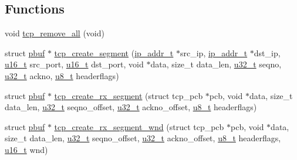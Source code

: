 \subsection*{Functions}
\begin{DoxyCompactItemize}
\item 
void \hyperlink{openmote-cc2538_2lwip_2test_2unit_2tcp_2tcp__helper_8c_ab5eb6956494f1deb9a97569d4b95ef6a}{tcp\+\_\+remove\+\_\+all} (void)
\item 
struct \hyperlink{structpbuf}{pbuf} $\ast$ \hyperlink{openmote-cc2538_2lwip_2test_2unit_2tcp_2tcp__helper_8c_aa6f4b7b087e8641f6c178d8752cc4fab}{tcp\+\_\+create\+\_\+segment} (\hyperlink{native_2lwip_2src_2include_2lwip_2ip__addr_8h_a88b43639738c4de2d3cd22e3a1fd7696}{ip\+\_\+addr\+\_\+t} $\ast$src\+\_\+ip, \hyperlink{native_2lwip_2src_2include_2lwip_2ip__addr_8h_a88b43639738c4de2d3cd22e3a1fd7696}{ip\+\_\+addr\+\_\+t} $\ast$dst\+\_\+ip, \hyperlink{group__compiler__abstraction_ga77570ac4fcab86864fa1916e55676da2}{u16\+\_\+t} src\+\_\+port, \hyperlink{group__compiler__abstraction_ga77570ac4fcab86864fa1916e55676da2}{u16\+\_\+t} dst\+\_\+port, void $\ast$data, size\+\_\+t data\+\_\+len, \hyperlink{group__compiler__abstraction_ga4c14294869aceba3ef9d4c0c302d0f33}{u32\+\_\+t} seqno, \hyperlink{group__compiler__abstraction_ga4c14294869aceba3ef9d4c0c302d0f33}{u32\+\_\+t} ackno, \hyperlink{group__compiler__abstraction_ga4caecabca98b43919dd11be1c0d4cd8e}{u8\+\_\+t} headerflags)
\item 
struct \hyperlink{structpbuf}{pbuf} $\ast$ \hyperlink{openmote-cc2538_2lwip_2test_2unit_2tcp_2tcp__helper_8c_a53b3207c8e960cdad9af044b0606a55b}{tcp\+\_\+create\+\_\+rx\+\_\+segment} (struct tcp\+\_\+pcb $\ast$pcb, void $\ast$data, size\+\_\+t data\+\_\+len, \hyperlink{group__compiler__abstraction_ga4c14294869aceba3ef9d4c0c302d0f33}{u32\+\_\+t} seqno\+\_\+offset, \hyperlink{group__compiler__abstraction_ga4c14294869aceba3ef9d4c0c302d0f33}{u32\+\_\+t} ackno\+\_\+offset, \hyperlink{group__compiler__abstraction_ga4caecabca98b43919dd11be1c0d4cd8e}{u8\+\_\+t} headerflags)
\item 
struct \hyperlink{structpbuf}{pbuf} $\ast$ \hyperlink{openmote-cc2538_2lwip_2test_2unit_2tcp_2tcp__helper_8c_aa45bbb22d0e973f9af6732ac35faed68}{tcp\+\_\+create\+\_\+rx\+\_\+segment\+\_\+wnd} (struct tcp\+\_\+pcb $\ast$pcb, void $\ast$data, size\+\_\+t data\+\_\+len, \hyperlink{group__compiler__abstraction_ga4c14294869aceba3ef9d4c0c302d0f33}{u32\+\_\+t} seqno\+\_\+offset, \hyperlink{group__compiler__abstraction_ga4c14294869aceba3ef9d4c0c302d0f33}{u32\+\_\+t} ackno\+\_\+offset, \hyperlink{group__compiler__abstraction_ga4caecabca98b43919dd11be1c0d4cd8e}{u8\+\_\+t} headerflags, \hyperlink{group__compiler__abstraction_ga77570ac4fcab86864fa1916e55676da2}{u16\+\_\+t} wnd)

\end{DoxyCompactItemize}
